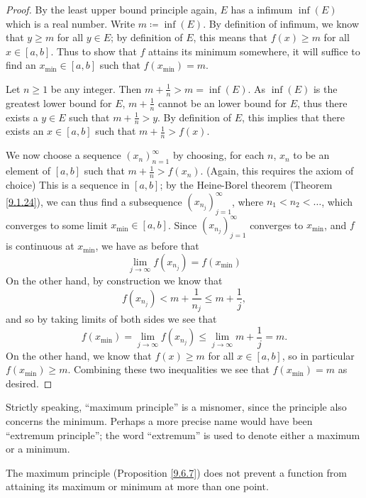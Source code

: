 \begin{proof}
    By the least upper bound principle again, \(E\) has a infimum \(\inf(E)\) which is a real number.
    Write \(m \coloneqq \inf(E)\).
    By definition of infimum, we know that \(y \geq m\) for all \(y \in E\);
    by definition of \(E\), this means that \(f(x) \geq m\) for all \(x \in [a, b]\).
    Thus to show that \(f\) attains its minimum somewhere, it will suffice to find an \(x_{\min} \in [a, b]\) such that \(f(x_{\min}) = m\).

    Let \(n \geq 1\) be any integer.
    Then \(m + \frac{1}{n} > m = \inf(E)\).
    As \(\inf(E)\) is the greatest lower bound for \(E\), \(m + \frac{1}{n}\) cannot be an lower bound for \(E\), thus there exists a \(y \in E\) such that \(m + \frac{1}{n} > y\).
    By definition of \(E\), this implies that there exists an \(x \in [a, b]\) such that \(m + \frac{1}{n} > f(x)\).

    We now choose a sequence \((x_n)_{n = 1}^\infty\) by choosing, for each \(n\), \(x_n\) to be an element of \([a, b]\) such that \(m + \frac{1}{n} > f(x_n)\).
    (Again, this requires the axiom of choice)
    This is a sequence in \([a, b]\);
    by the Heine-Borel theorem (Theorem \ref{9.1.24}), we can thus find a subsequence \((x_{n_j})_{j = 1}^\infty\), where \(n_1 < n_2 < \dots\), which converges to some limit \(x_{\min} \in [a, b]\).
    Since \((x_{n_j})_{j = 1}^\infty\) converges to \(x_{\min}\), and \(f\) is continuous at \(x_{\min}\), we have as before that
    \[
        \lim_{j \to \infty} f(x_{n_j}) = f(x_{\min})
    \]
    On the other hand, by construction we know that
    \[
        f(x_{n_j}) < m + \frac{1}{n_j} \leq m + \frac{1}{j},
    \]
    and so by taking limits of both sides we see that
    \[
        f(x_{\min}) = \lim_{j \to \infty} f(x_{n_j}) \leq \lim_{j \to \infty} m + \frac{1}{j} = m.
    \]
    On the other hand, we know that \(f(x) \geq m\) for all \(x \in [a, b]\), so in particular \(f(x_{\min}) \geq m\).
    Combining these two inequalities we see that \(f(x_{\min}) = m\) as desired.
\end{proof}

\begin{remark}\label{9.6.8}
    Strictly speaking, ``maximum principle'' is a misnomer, since the principle also concerns the minimum.
    Perhaps a more precise name would have been ``extremum principle'';
    the word ``extremum'' is used to denote either a maximum or a minimum.
\end{remark}

\begin{note}
    The maximum principle (Proposition \ref{9.6.7}) does not prevent a function from attaining its maximum or minimum at more than one point.
\end{note}

